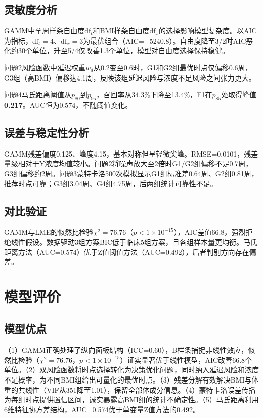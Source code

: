 \documentclass[withoutpreface]{cumcmthesis}
\begin{document}
\subsection{灵敏度分析}

GAMM中孕周样条自由度$\mathrm{df}_t$和BMI样条自由度$\mathrm{df}_x$的选择影响模型复杂度。以AIC为指标，$\mathrm{df}_t=4$、$\mathrm{df}_x=3$为最优组合（AIC=$-$5240.8）。自由度降至3/2时AIC恶化约30个单位，升至5/4仅改善1.3个单位，模型对自由度选择保持稳健。

问题2风险函数中延迟权重$w_d$从0.2变至0.6时，G1和G2组最优时点仅偏移0.6周，G3组（高BMI）偏移达4.1周，反映该组延迟风险与浓度不足风险之间张力更大。

问题4马氏距离阈值从$p_{80}$到$p_{95}$，召回率从34.3\%下降至13.4\%，F1在$p_{85}$处取得峰值\textbf{0.217}。AUC恒为0.574，不随阈值变化。

\subsection{误差与稳定性分析}

GAMM残差偏度0.125、峰度4.15，基本对称但呈轻微尖峰。RMSE=0.0101，残差量级相对于Y浓度均值较小。问题2将噪声放大至2倍时G1/G2组偏移不足0.7周，G3组偏移约2周。问题3蒙特卡洛500次模拟显示G1组标准差0.64周、G2组0.81周，推荐时点可靠；G3组3.04周、G4组4.75周，后两组统计可靠性不足。

\subsection{对比验证}

GAMM与LME的似然比检验$\chi^2=76.76$（$p<1\times10^{-15}$），AIC差值66.8，强烈拒绝线性假设。数据驱动3组方案BIC低于临床5组方案，且各组样本量更均衡。马氏距离方法（AUC=0.574）优于Z值阈值方法（AUC=0.492），后者判别方向存在偏差。

\section{模型评价}

\subsection{模型优点}

（1）GAMM正确处理了纵向面板结构（ICC=0.60），B样条捕捉非线性效应，似然比检验（$\chi^2=76.76$，$p<1\times10^{-15}$）证实显著优于线性模型，AIC改善66.8个单位。（2）双风险函数将时点选择转化为决策优化问题，同时纳入延迟风险和浓度不足概率，为不同BMI组给出可量化的最优时点。（3）残差分解有效解决BMI与体重的共线性（VIF从351降至1.01），保留全部体成分信息。（4）蒙特卡洛误差传播为每组时点提供置信区间，诚实暴露高BMI组的统计不确定性。（5）马氏距离利用6维特征协方差结构，AUC=0.574优于单变量Z值方法的0.492。
\end{document}
